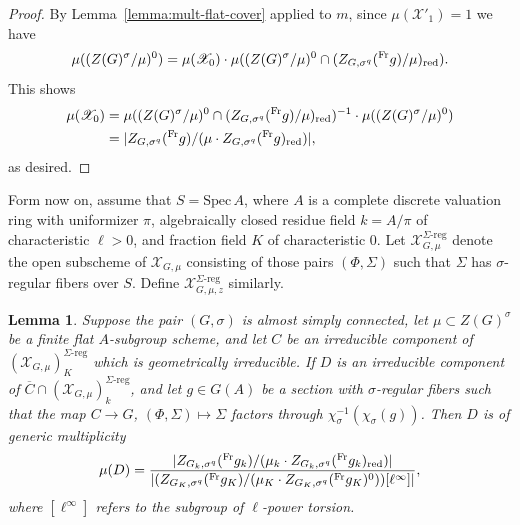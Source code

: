 \documentclass[11pt,reqno]{amsart}
\newtheorem{lemma}[theorem]{Lemma}
\theoremstyle{definition}
\renewcommand{\rm}{\mathrm}
\newcommand{\Spec}{\mathrm{Spec} \,}
\newcommand{\sX}{{\mathscr X}}
\newcommand{\ov}[1]{\overline{#1}}
\begin{document}
\begin{proof}
    By Lemma~\ref{lemma:mult-flat-cover} applied to $m$, since $\mu(\sX'_1) = 1$ we have
    \[
    \mu((Z(G)^\sigma/\mu)^0) = \mu(\sX_0) \cdot \mu((Z(G)^\sigma/\mu)^0 \cap (Z_{G,\sigma^q}(\prescript{\rm{Fr}}{}{g})/\mu)_{\rm{red}}).
    \]
    This shows
    \begin{align*}
    \mu(\sX_0)
    &= \mu((Z(G)^\sigma/\mu)^0 \cap (Z_{G,\sigma^q}(\prescript{\rm{Fr}}{}{g})/\mu)_{\rm{red}})^{-1} \cdot \mu((Z(G)^\sigma/\mu)^0) \\
    &= |Z_{G,\sigma^q}(\prescript{\rm{Fr}}{}{g})/(\mu \cdot Z_{G,\sigma^q}(\prescript{\rm{Fr}}{}{g})_{\rm{red}})|,
    \end{align*}
    as desired.
\end{proof}

Form now on, assume that $S = \Spec A$, where $A$ is a complete discrete valuation ring with uniformizer $\pi$, algebraically closed residue field $k = A/\pi$ of characteristic $\ell > 0$, and fraction field $K$ of characteristic $0$. Let $\sX_{G, \mu}^{\Sigma\textrm{-}\mathrm{reg}}$ denote the open subscheme of $\sX_{G, \mu}$ consisting of those pairs $(\Phi, \Sigma)$ such that $\Sigma$ has $\sigma$-regular fibers over $S$. Define $\sX_{G, \mu, z}^{\Sigma\textrm{-}\mathrm{reg}}$ similarly.

\begin{lemma}\label{lemma:asc-mult}
	Suppose the pair $(G, \sigma)$ is almost simply connected, let $\mu \subset Z(G)^\sigma$ be a finite flat $A$-subgroup scheme, and let $C$ be an irreducible component of $(\sX_{G,\mu})^{\Sigma\textrm{-}\mathrm{reg}}_K$ which is geometrically irreducible. If $D$ is an irreducible component of $\ov{C} \cap (\sX_{G,\mu})^{\Sigma\textrm{-}\mathrm{reg}}_k$, and let $g \in G(A)$ be a section with $\sigma$-regular fibers such that the map $C \to G$, $(\Phi, \Sigma) \mapsto \Sigma$ factors through $\chi_\sigma^{-1}(\chi_\sigma(g))$.  Then $D$ is of generic multiplicity
	\[
	\mu(D) = \frac{|Z_{G_k,\sigma^q}(\prescript{\rm{Fr}}{}{g_k})/(\mu_k \cdot Z_{G_k,\sigma^q}(\prescript{\rm{Fr}}{}{g_k})_{\rm{red}})|}{|(Z_{G_K,\sigma^q}(\prescript{\rm{Fr}}{}{g_K})/(\mu_K \cdot Z_{G_K,\sigma^q}(\prescript{\rm{Fr}}{}{g_K})^0))[\ell^\infty]|},
	\]
	where $[\ell^\infty]$ refers to the subgroup of $\ell$-power torsion.
\end{lemma}
\end{document}
